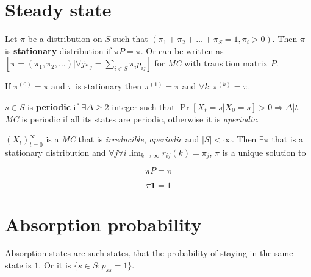 \section{Steady state}

\begin{defn}
	Let $\pi$ be a distribution on $S$ such that $\left( \pi_{1} + \pi_{2} + \dots + \pi_{S} = 1, \pi_{i} > 0\right)$. Then $\pi$ is \textbf{stationary} distribution if $\pi P = \pi$. Or can be written as \newline $\left[ \pi = (\pi_{1}, \pi_{2}, \dots) \vert \forall j \pi_{j} = \sum_{i \in S} \pi_{i} p_{ij}\right]$ for \textit{MC} with transition matrix $P$.
\end{defn}

\begin{observ}
	If $\pi^{(0)} = \pi$ and $\pi$ is stationary then $\pi^{(1)} = \pi$ and $\forall k : \pi^{(k)} = \pi$.
\end{observ}

\begin{defn}
	$s \in S$ is \textbf{periodic} if $\exists \Delta \geq 2$ integer such that $\Pr[X_{t} = s \vert X_{0} = s] > 0 \Rightarrow \Delta \vert t$. \textit{MC} is periodic if all its states are periodic, otherwise it is \textit{aperiodic}.
\end{defn}

\begin{thm}
	$(X_{t})_{t = 0}^{\infty}$ is a \textit{MC} that is \textit{irreducible}, \textit{aperiodic} and $|S| < \infty$. Then $\exists \pi$ that is a stationary distribution and $\forall j \forall i \lim_{k\to\infty}r_{ij}(k) = \pi_{j}$, $\pi$ is a unique solution to
	
	$$
	\pi P = \pi
	$$
	
	$$
	\pi \mathbf{1} = 1
	$$
\end{thm}

\section{Absorption probability}

\begin{defn}
	Absorption states are such states, that the probability of staying in the same state is $1$. Or it is $\{s \in S : p_{ss} = 1\}$.
\end{defn}



